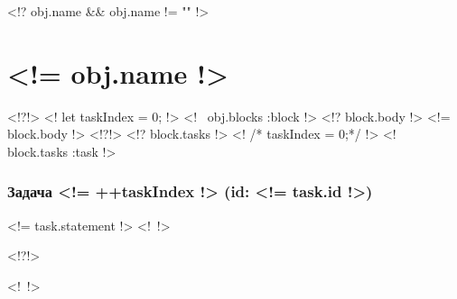 \documentclass[<!= f.optionsToString(f.documentClassOptions(pars)) !>]{article}
\begin{document}
    <!? obj.name && obj.name != "" !>
        \section*{<!= obj.name !>}
    <!?!>
    <! let taskIndex = 0; !>
    <!~ obj.blocks :block !>
        <!? block.body !>
            <!= block.body !>\nopagebreak
        <!?!>
        <!? block.tasks !>
            <! /* taskIndex = 0;*/ !>
            <!~ block.tasks :task !>
                \subsubsection*{Задача \textnumero <!= ++taskIndex !> (id: <!= task.id !>)}
                <!= task.statement !>
            <!~!>

        <!?!>
        
    <!~!>
\end{document}
